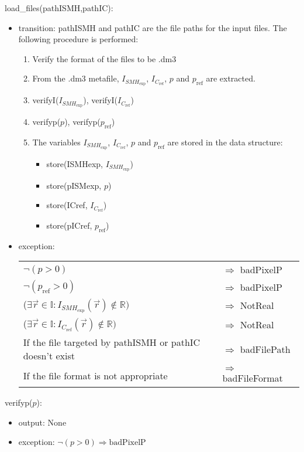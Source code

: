 \documentclass[12pt, titlepage]{article}
\begin{document}
\noindent load{\_}files(pathISMH,pathIC):
\begin{itemize}
\item transition: pathISMH and pathIC are the file paths for the input files. 
The following procedure is performed:
\begin{enumerate}
\item Verify the format of the files to be .dm3
\item From the .dm3 metafile, $I_{\mathit{SMH}_{\text{exp}}}$, 
$I_{C_{\text{ref}}}$, $p$ and $p_{\text{ref}}$ are extracted.
\item verifyI($I_{\mathit{SMH}_{\text{exp}}}$), verifyI($I_{C_{\text{ref}}}$)
\item verifyp($p$), verifyp($p_{\text{ref}}$)
\item The variables $I_{\mathit{SMH}_{\text{exp}}}$, $I_{C_{\text{ref}}}$, $p$ 
and $p_{\text{ref}}$ are stored in the data structure:
\begin{itemize}
\item store(ISMHexp, $I_{\mathit{SMH}_{\text{exp}}}$)
\item store(pISMexp, $p$)
\item store(ICref, $I_{C_{\text{ref}}}$)
\item store(pICref, $p_{\text{ref}}$)
\end{itemize}
\end{enumerate}   
\item exception:
\noindent \begin{longtable*}[l]{l l} 
$\neg (p > 0)$ & $\Rightarrow$ badPixelP\\
$\neg (p_{\text{ref}} > 0)$ & $\Rightarrow$ badPixelP\\
($\exists \vec{r} \in \mathbb{I}:I_{\mathit{SMH}_{\text{exp}}}(\vec{r}) \notin 
\mathbb{R})$ & $\Rightarrow$ NotReal\\
($\exists \vec{r} \in \mathbb{I}:I_{C_{\text{ref}}}(\vec{r}) \notin \mathbb{R})$ 
& $\Rightarrow$ NotReal\\
If the file targeted by pathISMH or pathIC doesn't exist & $\Rightarrow$ 
badFilePath\\
If the file format is not appropriate & $\Rightarrow$ badFileFormat\\
\end{longtable*}
\end{itemize}

\noindent verifyp($p$):
\begin{itemize}
\item output: None
\item exception:\newline
$\neg (p > 0 )\Rightarrow \text{badPixelP}$
\end{itemize}
\bigskip
\end{document}
